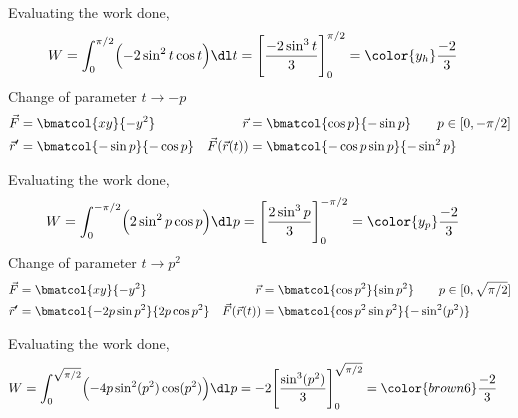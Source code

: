 \begin{enumerate}
\begin{enumerate}
                    Evaluating the work done,
                    \begin{align}
                        W & = \int_{0}^{\pi/2} \Bigl( -2\sin^2 t \cos t \Bigr) \dl t
                        = \Bigg[ \frac{-2\sin^3 t}{3} \Bigg]_0^{\pi/2}
                        = \color{y_h} \frac{-2}{3}
                    \end{align}
                    Change of parameter $ t \rightarrow -p $
                    \begin{align}
                        \vec{F}             & = \bmatcol{xy}{-y^2}                  &
                        \vec{r}             & =
                        \bmatcol{\cos p}{-\sin p} \qquad p \in [0, -\pi/2]            \\
                        \vec{r}'            & = \bmatcol{-\sin p}{-\cos p}          &
                        \vec{F}(\vec{r}(t)) & = \bmatcol{-\cos p \sin p}{-\sin^2 p}
                    \end{align}

                    Evaluating the work done,
                    \begin{align}
                        W & = \int_{0}^{-\pi/2} \Bigl( 2\sin^2 p \cos p \Bigr) \dl p
                        = \Bigg[ \frac{2\sin^3 p}{3} \Bigg]_0^{-\pi/2}
                        = \color{y_p} \frac{-2}{3}
                    \end{align}
                    Change of parameter $ t \rightarrow p^2 $
                    \begin{align}
                        \vec{F}             & = \bmatcol{xy}{-y^2}                &
                        \vec{r}             & =
                        \bmatcol{\cos p^2}{\sin p^2} \qquad p \in [0, \sqrt{\pi/2}] \\
                        \vec{r}'            & = \bmatcol{-2p\sin p^2}{2p\cos p^2} &
                        \vec{F}(\vec{r}(t)) & = \bmatcol{\cos p^2 \sin p^2}
                        {-\sin^2 (p^2)}
                    \end{align}

                    Evaluating the work done,
                    \begin{align}
                        W & = \int_{0}^{\sqrt{\pi/2}} \Bigl( -4p\sin^2(p^2) \cos(p^2)
                        \Bigr) \dl p = -2 \Bigg[ \frac{\sin^3 (p^2)}{3}
                            \Bigg]_0^{\sqrt{\pi/2}} = \color{brown6} \frac{-2}{3}
                    \end{align}


\end{enumerate}
\end{enumerate}
